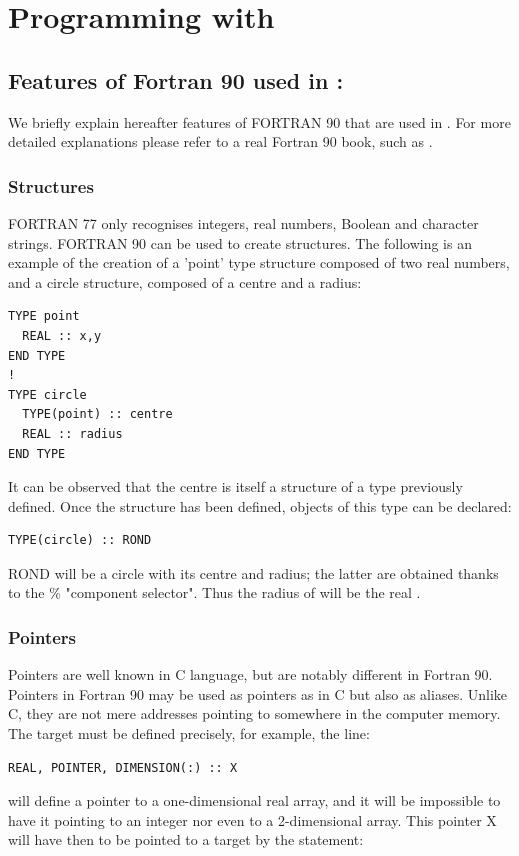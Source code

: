 \chapter{Programming with \bief}
\label{ref:programmingbief}
%
%
%
\section{Features of Fortran 90 used in \bief:}
%
We briefly explain hereafter features of FORTRAN 90 that are used in \bief. For
more detailed explanations please refer to a real Fortran 90 book, such as
\citet{Metcalf1990}.

\subsection{Structures}

FORTRAN 77 only recognises integers, real numbers, Boolean and character
strings. FORTRAN 90 can be used to create structures. The following is an
example of the creation of a 'point' type structure composed of two real
numbers, and a circle structure, composed of a centre and a radius:

\begin{lstlisting}[language=TelFortran]
TYPE point
  REAL :: x,y
END TYPE
!
TYPE circle
  TYPE(point) :: centre
  REAL :: radius
END TYPE
\end{lstlisting}

It can be observed that the centre is itself a structure of a type previously
defined. Once the structure has been defined, objects of this type can be
declared:
\begin{lstlisting}[language=TelFortran]
TYPE(circle) :: ROND
\end{lstlisting}
ROND will be a circle with its centre and radius; the latter are obtained
thanks to the \% "component selector". Thus the radius of  will be
the real .

\subsection{Pointers}

Pointers are well known in C language, but are notably different in Fortran 90.
Pointers in Fortran 90 may be used as pointers as in C but also as aliases.
Unlike C, they are not mere addresses pointing to somewhere in the computer
memory. The target must be defined precisely, for example, the line:

\begin{lstlisting}[language=TelFortran]
REAL, POINTER, DIMENSION(:) :: X
\end{lstlisting}
will define a pointer to a one-dimensional real array, and it will be
impossible to have it pointing to an integer nor even to a 2-dimensional array.
This pointer X will have then to be pointed to a target by the statement:


